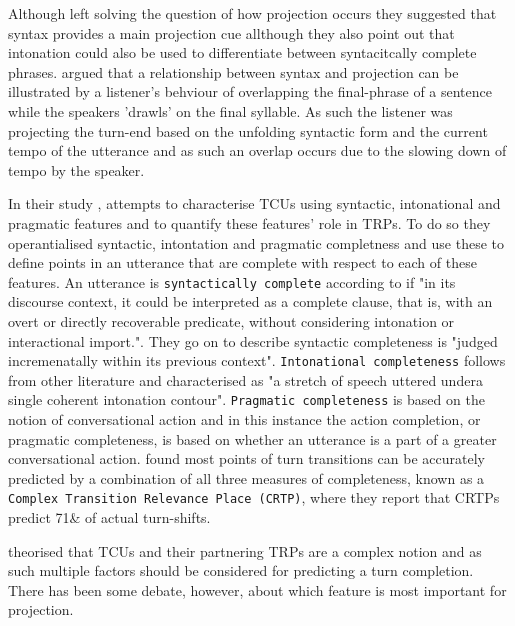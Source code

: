 \documentclass[logo,bsc,singlespacing,parskip]{infthesis}
\begin{document}
Although \cite{Sacks1996} left solving the question of how projection occurs they suggested that syntax provides a main projection cue allthough they also point out that intonation could also be used to differentiate between syntacitcally complete phrases. \cite{Sacks1974} argued that a relationship between syntax and projection can be illustrated by a listener's behviour of overlapping the final-phrase of a sentence while the speakers 'drawls' on the final syllable. As such the listener was projecting the turn-end based on the unfolding syntactic form and the current tempo of the utterance and as such an overlap occurs due to the slowing down of tempo by the speaker. 

In their study \cite{Ford1996}, attempts to characterise TCUs using syntactic, intonational and pragmatic features and to quantify these features' role in TRPs. To do so they operantialised syntactic, intontation and pragmatic completness and use these to define points in an utterance that are complete with respect to each of these features. An utterance is \texttt{syntactically complete} according to \cite{Ford1996} if "in its discourse context, it could be interpreted as a complete clause, that is, with an overt or directly recoverable predicate, without considering intonation or interactional import.". They go on to describe syntactic completeness is "judged incremenatally within its previous context". \texttt{Intonational completeness} follows from other literature \cite{DuBoise1993} and characterised as "a stretch of speech uttered undera single coherent intonation contour". \texttt{Pragmatic completeness} is based on the notion of conversational action and in this instance the action completion, or pragmatic completeness, is based on whether an utterance is a part of a greater conversational action. \cite{Ford1996} found most points of turn transitions can be accurately predicted by a combination of all three measures of completeness, known as a \texttt{Complex Transition Relevance Place (CRTP)}, where they report that CRTPs predict 71\& of actual turn-shifts. 

\cite{Ford1996} theorised that TCUs and their partnering TRPs are a complex notion and as such multiple factors should be considered for predicting a turn completion. There has been some debate, however, about which feature is most important for projection. 
\end{document}
